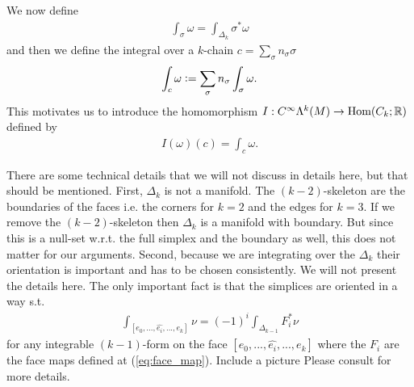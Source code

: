 \documentclass[../master_thesis.tex]{subfiles}
\begin{document}
We now define 
\begin{align*}
    \int_\sigma \omega = \int_{\Delta_k} \sigma^* \omega
\end{align*}
and then we define the integral over a $k$-chain 
$c = \sum_\sigma n_\sigma \sigma$
\begin{align*}
    \int_c \omega \vcentcolon= \sum \limits_\sigma n_\sigma \int_\sigma \omega.
\end{align*}
This motivates us to introduce the homomorphism $I: C^\infty \Lambda^k (M) 
\rightarrow \text{Hom}(C_k;\mathbb{R})$ defined by 
\begin{align*}
    I(\omega)(c) = \int_c \omega.
\end{align*}
\begin{remark}
    There are some technical details that we will not discuss in details here,
    but that should be mentioned. First, $\Delta_k$ is not a manifold. 
    The $(k-2)$-skeleton are the boundaries of the faces i.e. the corners for $k=2$ and the 
    edges for $k=3$. If we remove the $(k-2)$-skeleton 
    then $\Delta_k$ is a manifold 
    with boundary. But since this is a null-set w.r.t. the full simplex and 
    the boundary as well, this does not matter for our arguments. 
    Second, because we are integrating over the $\Delta_k$ their orientation is 
    important and has to be chosen consistently. We will not present the details here. The 
    only important fact is that the simplices are oriented in a way s.t.
    \begin{align}
        \int_{[e_0,...,\widehat{e_i}, ..., e_k]} \nu = (-1)^i \int_{\Delta_{k-1}} F_i^* \nu 
        \label{eq:integral_boundary_face}
    \end{align}
    for any integrable $(k-1)$-form on the face $[e_0,...,\widehat{e_i}, ..., e_k]$
    where the $F_i$ are the face maps defined at (\ref{eq:face_map}).
    {\color{red} Include a picture} Please consult \cite[Sec. V.5]{arnold} for more 
    details.
\end{remark}
\end{document}
